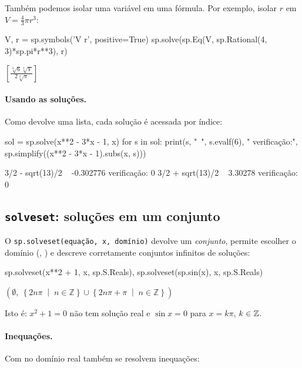 Também podemos isolar uma variável em uma fórmula. Por exemplo, isolar $r$ em $V=\frac43\pi r^3$:

\begin{entrada}
V, r = sp.symbols('V r', positive=True)
sp.solve(sp.Eq(V, sp.Rational(4, 3)*sp.pi*r**3), r)
\end{entrada}
\begin{saidamat}
$\displaystyle \left[ \frac{\sqrt[3]{6} \sqrt[3]{V}}{2 \sqrt[3]{\pi}}\right]$
\end{saidamat}

\paragraph{Usando as soluções.} Como  devolve uma lista, cada solução é acessada por índice:

\begin{entrada}
sol = sp.solve(x**2 - 3*x - 1, x)
for s in sol:
    print(s, "~", s.evalf(6), "  verificação:", sp.simplify((x**2 - 3*x - 1).subs(x, s)))
\end{entrada}
\begin{saida}
3/2 - sqrt(13)/2 ~ -0.302776   verificação: 0
3/2 + sqrt(13)/2 ~ 3.30278   verificação: 0
\end{saida}

\subsection{\texttt{solveset}: soluções em um conjunto}

O \texttt{sp.solveset(equação, x, domínio)} devolve um \emph{conjunto}, permite escolher o domínio
(, ) e descreve corretamente conjuntos infinitos de soluções:

\begin{entrada}
sp.solveset(x**2 + 1, x, sp.S.Reals), sp.solveset(sp.sin(x), x, sp.S.Reals)
\end{entrada}
\begin{saidamat}
$\displaystyle \left( \emptyset, \  \left\{2 n \pi\; \middle|\; n \in \mathbb{Z}\right\} \cup \left\{2 n \pi + \pi\; \middle|\; n \in \mathbb{Z}\right\}\right)$
\end{saidamat}

Isto é: $x^2+1=0$ não tem solução real e $\sin x = 0$ para $x = k\pi$, $k\in\mathbb{Z}$.

\paragraph{Inequações.} Com  no domínio real também se resolvem inequações:

